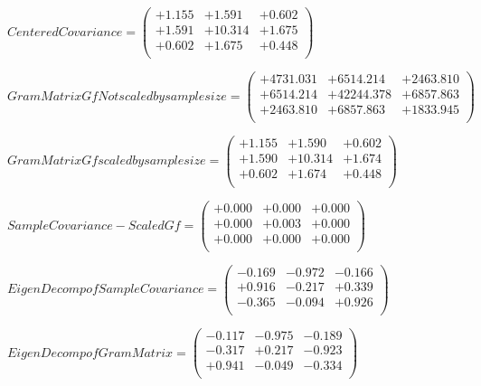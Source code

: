 \documentclass[9pt]{article}
\theoremstyle{plain}
\theoremstyle{definition}
\theoremstyle{remark}
\numberwithin{equation}{section}
\begin{document}
$Centered Covariance = \left(
\begin{array}{
ccc}
+1.155 & +1.591 & +0.602 \\
+1.591 & +10.314 & +1.675 \\
+0.602 & +1.675 & +0.448 \\
\end{array}
\right)$ \newline 

$Gram Matrix Gf Not scaled by sample size = \left(
\begin{array}{
ccc}
+4731.031 & +6514.214 & +2463.810 \\
+6514.214 & +42244.378 & +6857.863 \\
+2463.810 & +6857.863 & +1833.945 \\
\end{array}
\right)$ \newline 

$Gram Matrix Gf  scaled by sample size = \left(
\begin{array}{
ccc}
+1.155 & +1.590 & +0.602 \\
+1.590 & +10.314 & +1.674 \\
+0.602 & +1.674 & +0.448 \\
\end{array}
\right)$ \newline 

$SampleCovariance - Scaled Gf = \left(
\begin{array}{
ccc}
+0.000 & +0.000 & +0.000 \\
+0.000 & +0.003 & +0.000 \\
+0.000 & +0.000 & +0.000 \\
\end{array}
\right)$ \newline 

$EigenDecomp of SampleCovariance = \left(
\begin{array}{
ccc}
-0.169 & -0.972 & -0.166 \\
+0.916 & -0.217 & +0.339 \\
-0.365 & -0.094 & +0.926 \\
\end{array}
\right)$ \newline 

$EigenDecomp of Gram Matrix = \left(
\begin{array}{
ccc}
-0.117 & -0.975 & -0.189 \\
-0.317 & +0.217 & -0.923 \\
+0.941 & -0.049 & -0.334 \\
\end{array}
\right)$ \newline 
\end{document}

